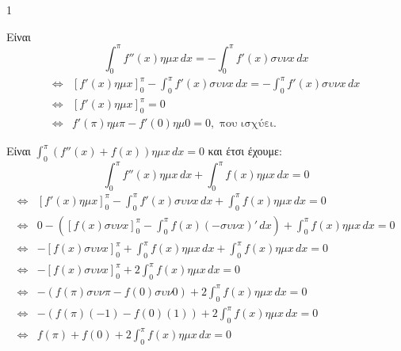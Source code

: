 \begin{ylh}{1}
    \item [Ύλη από εικόνα]
\end{ylh}
\begin{alist}
\item[α)] Είναι
\[
\int_0^\pi f''(x) \eta\mu x \, dx = -\int_0^\pi f'(x) \sigma\upsilon\nu x \, dx
\]
\begin{align*}
\Leftrightarrow &\left[ f'(x)\eta\mu x \right]_0^\pi - \int_0^\pi f'(x)\sigma\upsilon\nu x \, dx = -\int_0^\pi f'(x)\sigma\upsilon\nu x \, dx \\
\Leftrightarrow &\left[ f'(x)\eta\mu x \right]_0^\pi = 0 \\
\Leftrightarrow &f'(\pi)\eta\mu\pi - f'(0)\eta\mu 0 = 0, \text{ που ισχύει.}
\end{align*}

\item[β)] Είναι $\int_0^\pi (f''(x) + f(x)) \eta\mu x \, dx = 0$ και έτσι έχουμε:
\[
\int_0^\pi f''(x)\eta\mu x \, dx + \int_0^\pi f(x)\eta\mu x \, dx = 0
\]
\begin{align*}
\Leftrightarrow &\left[ f'(x)\eta\mu x \right]_0^\pi - \int_0^\pi f'(x)\sigma\upsilon\nu x \, dx + \int_0^\pi f(x)\eta\mu x \, dx = 0 \\
\Leftrightarrow &0 - \left( \left[ f(x)\sigma\upsilon\nu x \right]_0^\pi - \int_0^\pi f(x)(-\sigma\upsilon\nu x)' \, dx \right) + \int_0^\pi f(x)\eta\mu x \, dx = 0 \\
\Leftrightarrow &-\left[ f(x)\sigma\upsilon\nu x \right]_0^\pi + \int_0^\pi f(x)\eta\mu x \, dx + \int_0^\pi f(x)\eta\mu x \, dx = 0 \\
\Leftrightarrow &-\left[ f(x)\sigma\upsilon\nu x \right]_0^\pi + 2\int_0^\pi f(x)\eta\mu x \, dx = 0 \\
\Leftrightarrow &-\left( f(\pi)\sigma\upsilon\nu\pi - f(0)\sigma\upsilon\nu 0 \right) + 2\int_0^\pi f(x)\eta\mu x \, dx = 0 \\
\Leftrightarrow &-\left( f(\pi)(-1) - f(0)(1) \right) + 2\int_0^\pi f(x)\eta\mu x \, dx = 0 \\
\Leftrightarrow &f(\pi) + f(0) + 2\int_0^\pi f(x)\eta\mu x \, dx = 0
\end{align*}


\end{alist}
